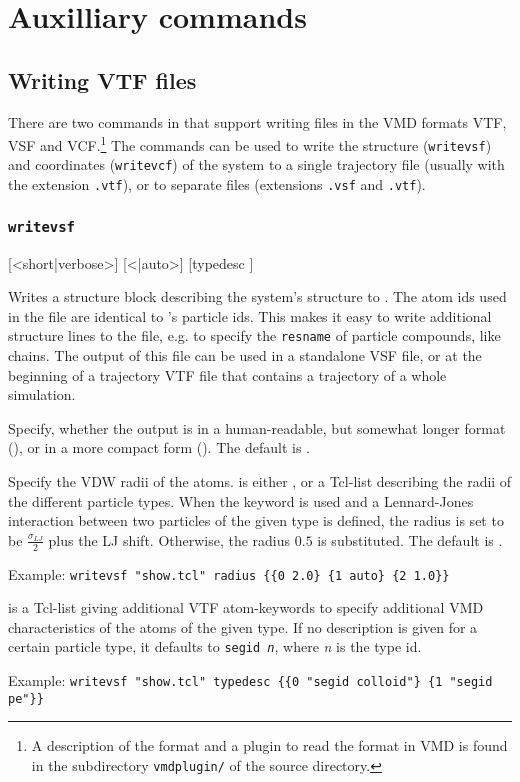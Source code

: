 \chapter{Auxilliary commands}
\label{chap:aux}

\section{Writing VTF files}

There are two commands in \es{} that support writing files in the VMD
formats VTF, VSF and VCF.\footnote{A description of the format and a
  plugin to read the format in VMD is found in the subdirectory
  \texttt{vmdplugin/} of the \es{} source directory.} The commands can
be used to write the structure (\texttt{writevsf}) and coordinates
(\texttt{writevcf}) of the system to a single trajectory file (usually
with the extension \texttt{.vtf}), or to separate files (extensions
\texttt{.vsf} and \texttt{.vtf}).

\subsection{\texttt{writevsf}}

{ [<short|verbose>] [<|auto>] [typedesc ]}

Writes a structure block describing the system's structure to
. The atom ids used in the file are identical to \es's
particle ids.  This makes it easy to write additional structure lines
to the file, e.g. to specify the \texttt{resname} of particle
compounds, like chains.  The output of this file can be used in a
standalone VSF file, or at the beginning of a trajectory VTF file that
contains a trajectory of a whole simulation.

\begin{tcloptions}
  Specify, whether the output is in a human-readable, but somewhat
  longer format (), or in a more compact form
  (). The default is .
  
  Specify the VDW radii of the atoms.  is either
  , or a Tcl-list describing the radii of the different
  particle types. When the keyword  is used and a
  Lennard-Jones interaction between two particles of the given type is
  defined, the radius is set to be $\frac{\sigma_{LJ}}{2}$ plus the LJ
  shift.  Otherwise, the radius $0.5$ is substituted. The default is
  .
  
  Example: \verb!writevsf "show.tcl" radius {{0 2.0} {1 auto} {2 1.0}}!
  
   is a Tcl-list giving additional VTF atom-keywords to
  specify additional VMD characteristics of the atoms of the given type.
  If no description is given for a certain particle type, it defaults to
  \texttt{segid \textit{n}}, where \textit{n} is the type id.

  Example: \verb!writevsf "show.tcl" typedesc {{0 "segid colloid"} {1 "segid pe"}}!
\end{tcloptions}


